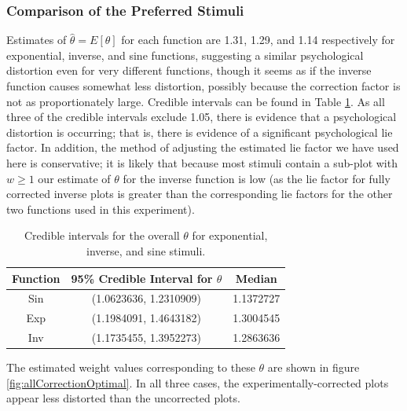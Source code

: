 \documentclass[11pt]{isuthesis}\usepackage[]{graphicx}\usepackage[]{color}
\begin{document}
\subsubsection*{Comparison of the Preferred Stimuli}
Estimates of $\hat\theta = E[\theta]$ for each function are 1.31, 1.29, and 1.14 respectively for exponential, inverse, and sine functions, suggesting a similar psychological distortion even for very different functions, though it seems as if the inverse function causes somewhat less distortion, possibly because the correction factor is not as proportionately large. Credible intervals can be found in Table \ref{tab:credibleintervalstable}. As all three of the credible intervals exclude 1.05, there is evidence that a psychological distortion is occurring; that is, there is evidence of a significant psychological lie factor. In addition, the method of adjusting the estimated lie factor we have used here is conservative; it is likely that because most stimuli contain a sub-plot with $w\geq 1$ our estimate of $\theta$ for the inverse function is low (as the lie factor for fully corrected inverse plots is greater than the corresponding lie factors for the other two functions used in this experiment). 

\begin{table}[tp]\centering
\caption{Credible intervals for the overall $\theta$ for exponential, inverse, and sine stimuli.\label{tab:credibleintervalstable}}\begin{tabular}{ccc}\hline
Function & 95\% Credible Interval for $\theta$ & Median\\\hline
Sin & (1.0623636, 1.2310909) & 1.1372727\\
Exp & (1.1984091, 1.4643182) & 1.3004545\\
Inv & (1.1735455, 1.3952273) & 1.2863636\\
\hline
\end{tabular}
\end{table}

The estimated weight values corresponding to these $\theta$ are shown in figure \ref{fig:allCorrectionOptimal}. In all three cases, the experimentally-corrected plots appear less distorted than the uncorrected plots. 
\end{document}
